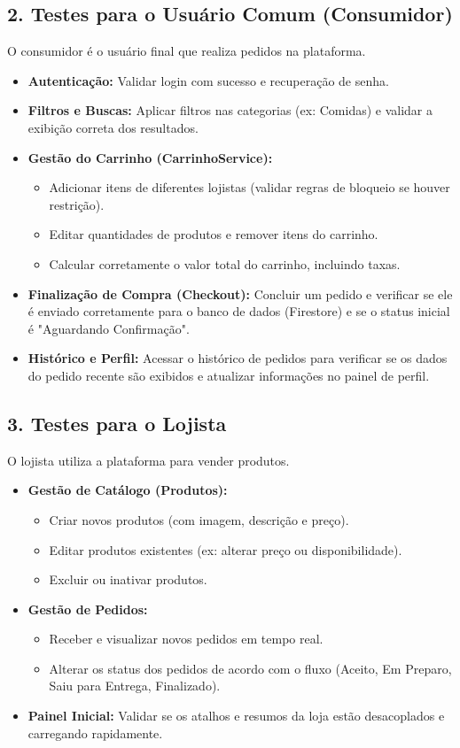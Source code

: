 \documentclass[a4paper,12pt]{article}
\begin{document}
\subsection{2. Testes para o Usuário Comum (Consumidor)}
O consumidor é o usuário final que realiza pedidos na plataforma.
\begin{itemize}
    \item \textbf{Autenticação:} Validar login com sucesso e recuperação de senha.
    \item \textbf{Filtros e Buscas:} Aplicar filtros nas categorias (ex: Comidas) e validar a exibição correta dos resultados.
    \item \textbf{Gestão do Carrinho (CarrinhoService):}
    \begin{itemize}
        \item Adicionar itens de diferentes lojistas (validar regras de bloqueio se houver restrição).
        \item Editar quantidades de produtos e remover itens do carrinho.
        \item Calcular corretamente o valor total do carrinho, incluindo taxas.
    \end{itemize}
    \item \textbf{Finalização de Compra (Checkout):} Concluir um pedido e verificar se ele é enviado corretamente para o banco de dados (Firestore) e se o status inicial é "Aguardando Confirmação".
    \item \textbf{Histórico e Perfil:} Acessar o histórico de pedidos para verificar se os dados do pedido recente são exibidos e atualizar informações no painel de perfil.
\end{itemize}

\subsection{3. Testes para o Lojista}
O lojista utiliza a plataforma para vender produtos.
\begin{itemize}
    \item \textbf{Gestão de Catálogo (Produtos):}
    \begin{itemize}
        \item Criar novos produtos (com imagem, descrição e preço).
        \item Editar produtos existentes (ex: alterar preço ou disponibilidade).
        \item Excluir ou inativar produtos.
    \end{itemize}
    \item \textbf{Gestão de Pedidos:}
    \begin{itemize}
        \item Receber e visualizar novos pedidos em tempo real.
        \item Alterar os status dos pedidos de acordo com o fluxo (Aceito, Em Preparo, Saiu para Entrega, Finalizado).
    \end{itemize}
    \item \textbf{Painel Inicial:} Validar se os atalhos e resumos da loja estão desacoplados e carregando rapidamente.
\end{itemize}
\end{document}
